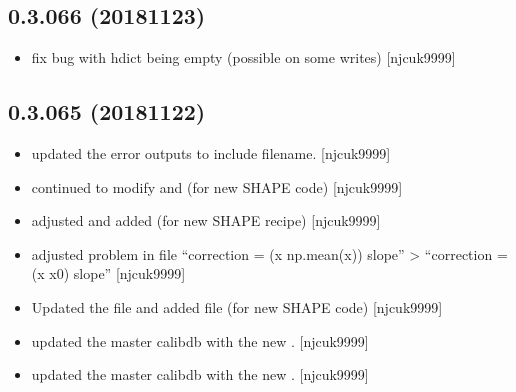 \documentclass[a4paper,10pt,english]{report}
\begin{document}
\subsection{0.3.066 (2018\sphinxhyphen{}11\sphinxhyphen{}23)}
\label{\detokenize{misc/changelog:id276}}\begin{itemize}
\item {} 
 \sphinxhyphen{} fix bug with hdict being empty (possible on some
writes) {[}njcuk9999{]}

\end{itemize}


\subsection{0.3.065 (2018\sphinxhyphen{}11\sphinxhyphen{}22)}
\label{\detokenize{misc/changelog:id277}}\begin{itemize}
\item {} 
 \sphinxhyphen{} updated the error outputs to include filename.
{[}njcuk9999{]}

\item {} 
 \sphinxhyphen{} continued to modify  and 
(for new SHAPE code) {[}njcuk9999{]}

\item {} 
 \sphinxhyphen{} adjusted  and added
 (for new SHAPE recipe) {[}njcuk9999{]}

\item {} 
 \sphinxhyphen{} adjusted problem in  file “correction = (x
\sphinxhyphen{} np.mean(x)) \sphinxtitleref{*} slope” \textendash{}\textgreater{} “correction = (x \sphinxhyphen{} x0) \sphinxtitleref{*} slope” {[}njcuk9999{]}

\item {} 
Updated the  file and added  file
(for new SHAPE code) {[}njcuk9999{]}

\item {} 
 \sphinxhyphen{} updated the master calibdb with the new
. {[}njcuk9999{]}

\item {} 
 \sphinxhyphen{} updated the master calibdb with the new
. {[}njcuk9999{]}


\end{itemize}
\end{document}
